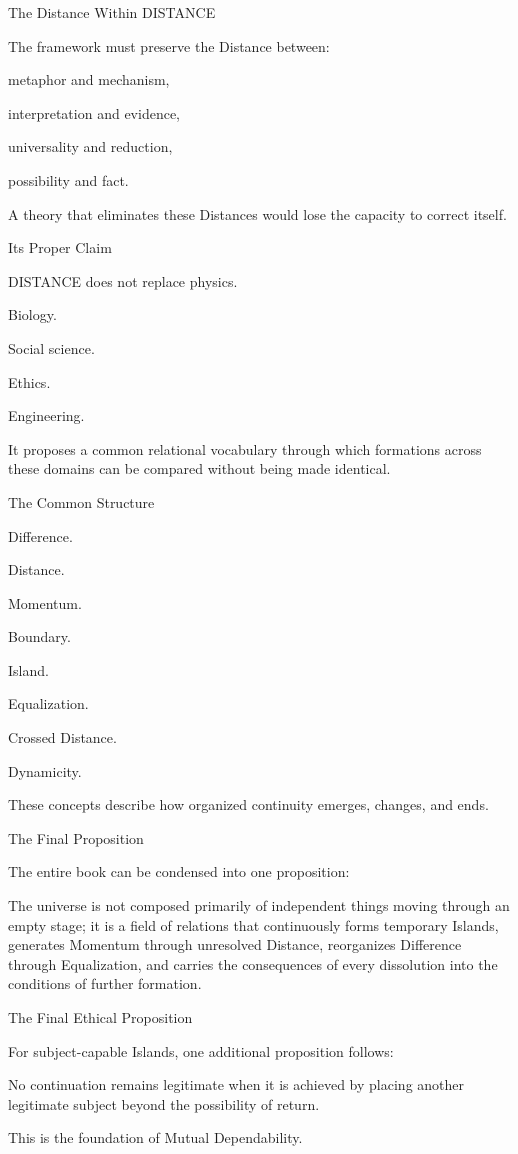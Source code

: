 The Distance Within DISTANCE

The framework must preserve the Distance between:

metaphor and mechanism,

interpretation and evidence,

universality and reduction,

possibility and fact.

A theory that eliminates these Distances would lose the capacity to correct itself.

Its Proper Claim

DISTANCE does not replace physics.

Biology.

Social science.

Ethics.

Engineering.

It proposes a common relational vocabulary through which formations across these domains can be compared without being made identical.

The Common Structure

Difference.

Distance.

Momentum.

Boundary.

Island.

Equalization.

Crossed Distance.

Dynamicity.

These concepts describe how organized continuity emerges, changes, and ends.

The Final Proposition

The entire book can be condensed into one proposition:

The universe is not composed primarily of independent things moving through an empty stage; it is a field of relations that continuously forms temporary Islands, generates Momentum through unresolved Distance, reorganizes Difference through Equalization, and carries the consequences of every dissolution into the conditions of further formation.

The Final Ethical Proposition

For subject-capable Islands, one additional proposition follows:

No continuation remains legitimate when it is achieved by placing another legitimate subject beyond the possibility of return.

This is the foundation of Mutual Dependability.


